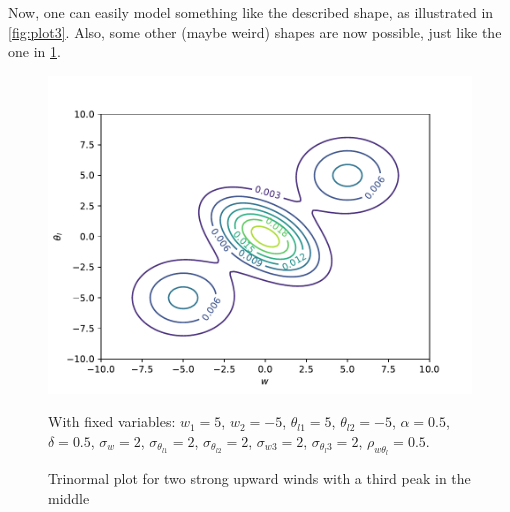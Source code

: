 Now, one can easily model something like the described shape,
as illustrated in \cref{fig:plot3}.
Also, some other (maybe weird) shapes are now possible,
just like the one in \cref{fig:plot4}.

\begin{figure}[!htb]
    \centering
    \includegraphics[width=.5\textwidth]{include/figures/plot4}
    \caption{Trinormal plot for two strong upward winds with a third peak in the middle}
    \label{fig:plot4}
    With fixed variables: $w_1 = 5$, $w_2 = -5$, $\theta_{l1} = 5$, $\theta_{l2} = -5$,
    $\alpha = 0.5$, $\delta=0.5$, $\sigma_w = 2$, $\sigma_{\theta_{l1}} = 2$,
    $\sigma_{\theta_{l2}} = 2$, $\sigma_{w3} = 2$, $\sigma_{\theta_l 3} = 2$,
    $\rho_{w\theta_l} = 0.5$.
\end{figure}